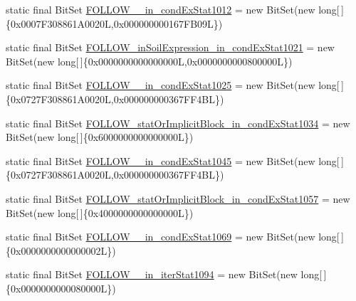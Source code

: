 \begin{DoxyCompactItemize}
\item 
static final Bit\-Set \hyperlink{classorg_1_1tzi_1_1use_1_1parser_1_1soil_1_1_soil_parser_a88dec5e0d0e706c06a07d9eb6bb0412f}{F\-O\-L\-L\-O\-W\-\_\-\_\-in\-\_\-cond\-Ex\-Stat1012} = new Bit\-Set(new long\mbox{[}$\,$\mbox{]}\{0x0007\-F308861\-A0020\-L,0x000000000167\-F\-B09\-L\})
\item 
static final Bit\-Set \hyperlink{classorg_1_1tzi_1_1use_1_1parser_1_1soil_1_1_soil_parser_ad90b237bf859cfec6e2db233cfe19f23}{F\-O\-L\-L\-O\-W\-\_\-in\-Soil\-Expression\-\_\-in\-\_\-cond\-Ex\-Stat1021} = new Bit\-Set(new long\mbox{[}$\,$\mbox{]}\{0x0000000000000000\-L,0x0000000000800000\-L\})
\item 
static final Bit\-Set \hyperlink{classorg_1_1tzi_1_1use_1_1parser_1_1soil_1_1_soil_parser_aea60f6d58312438c29c48ab0cc56c562}{F\-O\-L\-L\-O\-W\-\_\-\_\-in\-\_\-cond\-Ex\-Stat1025} = new Bit\-Set(new long\mbox{[}$\,$\mbox{]}\{0x0727\-F308861\-A0020\-L,0x000000000367\-F\-F4\-B\-L\})
\item 
static final Bit\-Set \hyperlink{classorg_1_1tzi_1_1use_1_1parser_1_1soil_1_1_soil_parser_adc969977074a4de803a77290fff9a96a}{F\-O\-L\-L\-O\-W\-\_\-stat\-Or\-Implicit\-Block\-\_\-in\-\_\-cond\-Ex\-Stat1034} = new Bit\-Set(new long\mbox{[}$\,$\mbox{]}\{0x6000000000000000\-L\})
\item 
static final Bit\-Set \hyperlink{classorg_1_1tzi_1_1use_1_1parser_1_1soil_1_1_soil_parser_a0e84f9ffad04146dd1ea850070528ac1}{F\-O\-L\-L\-O\-W\-\_\-\_\-in\-\_\-cond\-Ex\-Stat1045} = new Bit\-Set(new long\mbox{[}$\,$\mbox{]}\{0x0727\-F308861\-A0020\-L,0x000000000367\-F\-F4\-B\-L\})
\item 
static final Bit\-Set \hyperlink{classorg_1_1tzi_1_1use_1_1parser_1_1soil_1_1_soil_parser_a40f061450a482ce178a7f6b85d16b0b4}{F\-O\-L\-L\-O\-W\-\_\-stat\-Or\-Implicit\-Block\-\_\-in\-\_\-cond\-Ex\-Stat1057} = new Bit\-Set(new long\mbox{[}$\,$\mbox{]}\{0x4000000000000000\-L\})
\item 
static final Bit\-Set \hyperlink{classorg_1_1tzi_1_1use_1_1parser_1_1soil_1_1_soil_parser_a9c7ab4104cd9d093748d4f9ac304905c}{F\-O\-L\-L\-O\-W\-\_\-\_\-in\-\_\-cond\-Ex\-Stat1069} = new Bit\-Set(new long\mbox{[}$\,$\mbox{]}\{0x0000000000000002\-L\})
\item 
static final Bit\-Set \hyperlink{classorg_1_1tzi_1_1use_1_1parser_1_1soil_1_1_soil_parser_a57d6fbb31c16dfedccf85b950aff5449}{F\-O\-L\-L\-O\-W\-\_\-\_\-in\-\_\-iter\-Stat1094} = new Bit\-Set(new long\mbox{[}$\,$\mbox{]}\{0x0000000000080000\-L\})
\item 

\end{DoxyCompactItemize}
